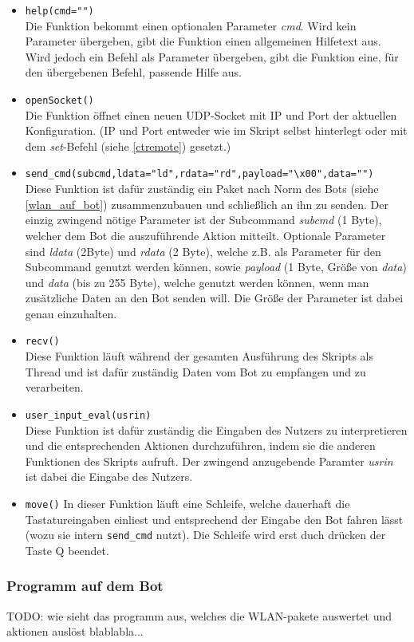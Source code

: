 \begin{itemize}
	\item \verb+help(cmd="")+\\
	Die Funktion bekommt einen optionalen Parameter \textit{cmd}. Wird kein Parameter übergeben, gibt die Funktion einen allgemeinen Hilfetext aus. Wird jedoch ein Befehl als Parameter übergeben, gibt die Funktion eine, für den übergebenen Befehl, passende Hilfe aus.
	\item \verb+openSocket()+\\
	Die Funktion öffnet einen neuen UDP-Socket mit IP und Port der aktuellen Konfiguration. (IP und Port entweder wie im Skript selbst hinterlegt oder mit dem \textit{set}-Befehl (siehe \ref{ctremote}) gesetzt.)
	\item \verb+send_cmd(subcmd,ldata="ld",rdata="rd",payload="\x00",data="")+\\
	Diese Funktion ist dafür zuständig ein Paket nach Norm des Bots (siehe \ref{wlan_auf_bot}) zusammenzubauen und schließlich an ihn zu senden.
	Der einzig zwingend nötige Parameter ist der Subcommand \textit{subcmd} (1 Byte), welcher dem Bot die auszuführende Aktion mitteilt.
	Optionale Parameter sind \textit{ldata} (2Byte) und \textit{rdata} (2 Byte), welche z.B. als Parameter für den Subcommand genutzt werden können, sowie \textit{payload} (1 Byte, Größe von \textit{data}) und \textit{data} (bis zu 255 Byte), welche genutzt werden können, wenn man zusätzliche Daten an den Bot senden will.
	Die Größe der Parameter ist dabei genau einzuhalten.
	\item \verb+recv()+\\
	Diese Funktion läuft während der gesamten Ausführung des Skripts als Thread und ist dafür zuständig Daten vom Bot zu empfangen und zu verarbeiten.
	\item \verb+user_input_eval(usrin)+\\
	Diese Funktion ist dafür zuständig die Eingaben des Nutzers zu interpretieren und die entsprechenden Aktionen durchzuführen, indem sie die anderen Funktionen des Skripts aufruft.
	Der zwingend anzugebende Paramter \textit{usrin} ist dabei die Eingabe des Nutzers.
	\item \verb+move()+
	In dieser Funktion läuft eine Schleife, welche dauerhaft die Tastatureingaben einliest und entsprechend der Eingabe den Bot fahren lässt (wozu sie intern \verb+send_cmd+ nutzt). Die Schleife wird erst duch drücken der Taste Q beendet.
\end{itemize}


\subsubsection{Programm auf dem Bot}
\label{ctremote_bot}
TODO: wie sieht das programm aus, welches die WLAN-pakete auswertet und aktionen auslöst blablabla...

